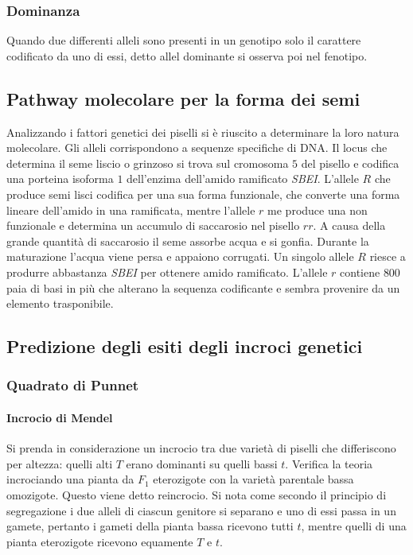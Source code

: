 \subsubsection{Dominanza}
Quando due differenti alleli sono presenti in un genotipo solo il carattere codificato da uno di essi, detto allel dominante si osserva poi nel fenotipo. 
\subsection{Pathway molecolare per la forma dei semi}
Analizzando i fattori genetici dei piselli si \`e riuscito a determinare la loro natura molecolare. Gli alleli corrispondono a sequenze specifiche di DNA. Il locus che determina il seme liscio o 
grinzoso si trova sul cromosoma $5$ del pisello e codifica una porteina isoforma $1$ dell'enzima dell'amido ramificato \emph{SBEI}. L'allele $R$ che produce semi lisci codifica per una sua forma
funzionale, che converte una forma lineare dell'amido in una ramificata, mentre l'allele $r$ me produce una non funzionale e determina un accumulo di saccarosio nel pisello $rr$. A causa della grande
quantit\`a di saccarosio il seme assorbe acqua e si gonfia. Durante la maturazione l'acqua viene persa e appaiono corrugati. Un singolo allele $R$ riesce a produrre abbastanza \emph{SBEI} per ottenere
amido ramificato. L'allele $r$ contiene $800$ paia di basi in pi\`u che alterano la sequenza codificante e sembra provenire da un elemento trasponibile.
\subsection{Predizione degli esiti degli incroci genetici}
\subsubsection{Quadrato di Punnet}
\paragraph{Incrocio di Mendel}
Si prenda in considerazione un incrocio tra due variet\`a di piselli che differiscono per altezza: quelli alti $T$ erano dominanti su quelli bassi $t$. Verifica la teoria incrociando una pianta da
$F_1$ eterozigote con la variet\`a parentale bassa omozigote. Questo viene detto reincrocio. Si nota come secondo il principio di segregazione i due alleli di ciascun genitore si separano e uno di 
essi passa in un gamete, pertanto i gameti della pianta bassa ricevono tutti $t$, mentre quelli di una pianta eterozigote ricevono equamente $T$ e $t$. 
